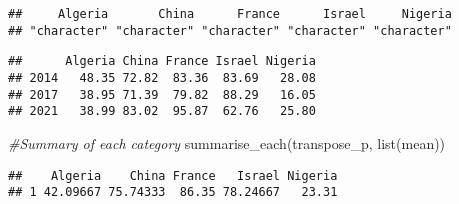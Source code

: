 \documentclass[
]{article}
\newenvironment{Shaded}{\begin{snugshade}}{\end{snugshade}}
\newcommand{\CommentTok}[1]{\textcolor[rgb]{0.56,0.35,0.01}{\textit{#1}}}
\newcommand{\FunctionTok}[1]{\textcolor[rgb]{0.00,0.00,0.00}{#1}}
\newcommand{\NormalTok}[1]{#1}
\newcommand{\OtherTok}[1]{\textcolor[rgb]{0.56,0.35,0.01}{#1}}
\newcommand{\SpecialCharTok}[1]{\textcolor[rgb]{0.00,0.00,0.00}{#1}}
\begin{document}
\begin{verbatim}
##     Algeria       China      France      Israel     Nigeria 
## "character" "character" "character" "character" "character"
\end{verbatim}

\begin{Shaded}
\end{Shaded}

\begin{verbatim}
##      Algeria China France Israel Nigeria
## 2014   48.35 72.82  83.36  83.69   28.08
## 2017   38.95 71.39  79.82  88.29   16.05
## 2021   38.99 83.02  95.87  62.76   25.80
\end{verbatim}

\begin{Shaded}
\begin{Highlighting}[]
\CommentTok{\#Summary of each category}
\FunctionTok{summarise\_each}\NormalTok{(transpose\_p, }\FunctionTok{list}\NormalTok{(mean))}
\end{Highlighting}
\end{Shaded}

\begin{verbatim}
##    Algeria    China France   Israel Nigeria
## 1 42.09667 75.74333  86.35 78.24667   23.31
\end{verbatim}
\end{document}
